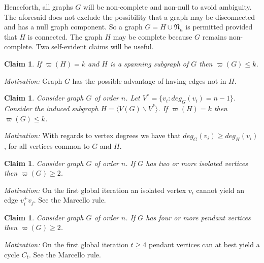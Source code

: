 \documentclass[12pt]{amsart}
\numberwithin{equation}{section}
\newtheorem{claim}[theorem]{Claim}
\numberwithin{equation}{section}
\begin{document}
Henceforth, all graphs $G$ will be non-complete and non-null to avoid ambiguity. The aforesaid does not exclude the possibility that a graph may be disconnected and has a null graph component. So a graph $G = H \cup \mathfrak{N}_n$ is permitted provided that $H$ is connected. The graph $H$ may be complete because $G$ remains non-complete. Two self-evident claims will be useful.
\begin{claim}\label{clm2}
If $\varpi(H) = k$ and $H$ is a spanning subgraph of $G$ then $\varpi(G) \leq k$.
\end{claim}
\textit{Motivation:} Graph $G$ has the possible advantage of having edges not in $H$.
\begin{claim}\label{clm3}
Consider graph $G$ of order $n$. Let $V^* = \{v_i: deg_G(v_i) = n-1\}$. Consider the induced subgraph $H = \langle V(G)\backslash V^*\rangle$. If $\varpi(H) = k$ then $\varpi(G) \leq k$.
\end{claim}
\textit{Motivation:} With regards to vertex degrees we have that $deg_G(v_i) \geq deg_H(v_i)$, for all vertices common to $G$ and $H$.
\begin{claim}\label{clm4}
Consider graph $G$ of order $n$. If $G$ has two or more isolated vertices then $\varpi(G) \geq 2$.
\end{claim}
\textit{Motivation:} On the first global iteration an isolated vertex $v_i$ cannot yield an edge $v^+_iv_j$. See the Marcello rule.
\begin{claim}\label{clm5}
Consider graph $G$ of order $n$. If $G$ has four or more pendant vertices then $\varpi(G) \geq 2$.
\end{claim}
\textit{Motivation:} On the first global iteration $t \geq 4$ pendant vertices can at best yield a cycle $C_t$. See the Marcello rule.
\end{document}
